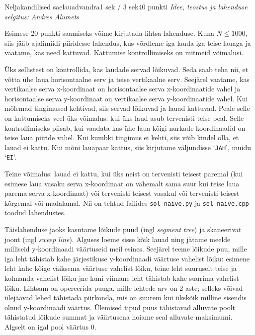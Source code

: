 \begin{yl}{3}{Neljakandilised saelauad}{vandra}{1 sek / 3 sek}{40 punkti}
  \emph{Idee, teostus ja lahenduse selgitus: Andres Alumets}
  
  Esimese 20 punkti saamiseks võime kirjutada lihtsa lahenduse.
  Kuna $N \le 1000$, siis jääb aja\-limiidi piiridesse lahendus, kus võrdleme iga lauda iga teise lauaga
  ja vaatame, kas need kattuvad. Kattumise kontrollimiseks on mitmeid võimalusi.

  Üks sellistest on kontrollida, kas laudade servad lõikuvad.
  Seda saab teha nii, et võtta ühe laua horisontaalne serv ja teise vertikaalne serv.
  Seejärel vaatame, kas vertikaalse serva x-koordinaat on horisontaalse serva x-koordinaatide vahel
  ja horisontaalse serva y-koordinaat on vertikaalse serva y-koordinaatide vahel.
  Kui mõlemad tingimused kehtivad, siis servad lõikuvad ja lauad kattuvad.
  Peale selle on kattumiseks veel üks võimalus: kui üks laud asub tervenisti teise peal.
  Selle kontrollimiseks piisab, kui vaadata kas ühe laua kõigi nurkade koordinaadid on teise laua piiride vahel.
  Kui kumbki tingimus ei kehti, siis võib kindel olla, et lauad ei kattu.
  Kui mõni lauapaar kattus, siis kirjutame väljundisse `\verb/JAH/', muidu `\verb/EI/'.

  Teine võimalus: lauad ei kattu, kui üks neist on tervenisti teisest paremal (kui esimese laua
  vasaku serva x-koordinaat on vähemalt sama suur kui teise laua parema serva x-koordinaat) või
  tervenisti teisest vasakul või tervenisti teisest kõrgemal või madalamal. Nii on tehtud failides
  \verb/sol_naive.py/ ja \verb/sol_naive.cpp/ toodud lahendustes.

  Täislahenduse jaoks kasutame lõikude puud (ingl \textit{segment tree}) ja skaneerivat joont (ingl \textit{sweep line}).
  Alguses loeme sisse kõik lauad ning jätame meelde milliseid y-koordinaadi väärtuseid meil esines.
  Seejärel teeme lõikude puu, mille iga leht tähistab kahe järjestikuse y-koordinaadi väärtuse vahelist lõiku:
  esimene leht kahe kõige väiksema väärtuse vahelist lõiku, teine leht suuruselt teise ja
  kolmanda vahelist lõiku jne kuni viimane leht tähistab kahe suurima vahelist lõiku.
  Lihtsam on opereerida puuga, mille lehtede arv on 2 aste; selleks võivad ülejäävad lehed tähistada
  piirkonda, mis on suurem kui ükskõik milline sisendis olnud y-koordinaadi väärtus.
  Ülemised tipud puus tähistavad alluvate poolt
  tähistatud lõikude summat ja väärtusena hoiame seal alluvate maksimumi.
  Algselt on igal pool väärtus 0.


\end{yl}
